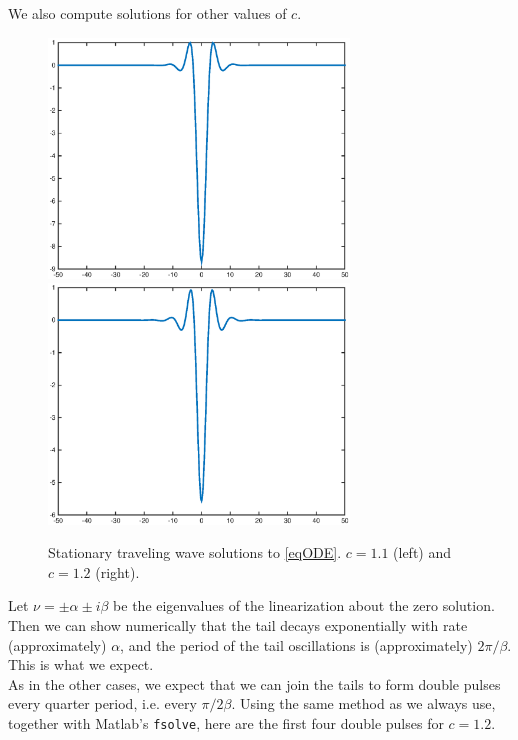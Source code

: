 \documentclass[12pt]{article}
\begin{document}
We also compute solutions for other values of $c$.

\begin{figure}[H]
\centering
\includegraphics[width=8cm]{single11.eps}
\includegraphics[width=8cm]{single12.eps}
\label{fig:single2}
\caption{Stationary traveling wave solutions to \eqref{eqODE}. $c = 1.1$ (left) and $c = 1.2$ (right).}
\end{figure}

Let $\nu = \pm \alpha \pm i \beta$ be the eigenvalues of the linearization about the zero solution. Then we can show numerically that the tail decays exponentially with rate (approximately) $\alpha$, and the period of the tail oscillations is (approximately) $2 \pi / \beta$. This is what we expect. \\

As in the other cases, we expect that we can join the tails to form double pulses every quarter period, i.e. every $\pi / 2 \beta$. Using the same method as we always use, together with Matlab's \texttt{fsolve}, here are the first four double pulses for $c = 1.2$.
\end{document}
